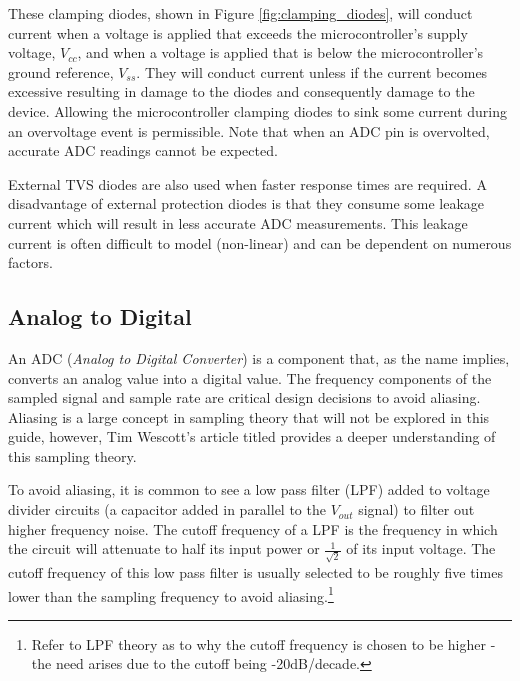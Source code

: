 \documentclass[main.tex]{subfiles}
\begin{document}
\noindent These clamping diodes, shown in Figure \ref{fig:clamping_diodes}, will conduct current when a voltage is applied that exceeds the microcontroller's supply voltage, $V_{cc}$, and when a voltage is applied that is below the microcontroller's ground reference, $V_{ss}$. They will conduct current unless if the current becomes excessive resulting in damage to the diodes and consequently damage to the device. Allowing the microcontroller clamping diodes to sink some current during an overvoltage event is permissible. Note that when an ADC pin is overvolted, accurate ADC readings cannot be expected. \newline

\newnoindentpara External TVS diodes are also used when faster response times are required. A disadvantage of external protection diodes is that they consume some leakage current which will result in less accurate ADC measurements. This leakage current is often difficult to model (non-linear) and can be dependent on numerous factors.

\subsection{Analog to Digital}
An ADC (\textit{Analog to Digital Converter}) is a component that, as the name implies, converts an analog value into a digital value. The frequency components of the sampled signal and sample rate are critical design decisions to avoid aliasing. Aliasing is a large concept in sampling theory that will not be explored in this guide, however, Tim Wescott's article titled  provides a deeper understanding of this sampling theory. \newline

\newnoindentpara To avoid aliasing, it is common to see a low pass filter (LPF) added to voltage divider circuits (a capacitor added in parallel to the $V_{out}$ signal) to filter out higher frequency noise. The cutoff frequency of a LPF is the frequency in which the circuit will attenuate to half its input power or $\frac{1}{\sqrt{2}}$ of its input voltage. The cutoff frequency of this low pass filter is usually selected to be roughly five times lower than the sampling frequency to avoid aliasing.\footnote{Refer to LPF theory as to why the cutoff frequency is chosen to be higher - the need arises due to the cutoff being -20dB/decade.}
\end{document}
